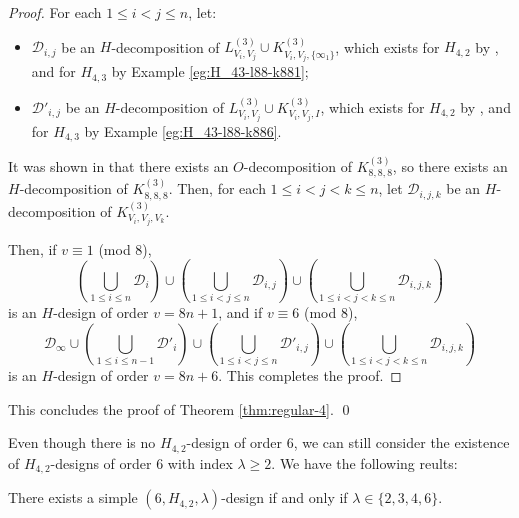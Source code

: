 \begin{proof}
For each $1 \leq i < j \leq n$, let:
\begin{itemize}
  \item $\mathcal{D}_{i,j}$ be an $H$-decomposition of $L_{V_i,V_j}^{(3)} \cup K_{V_i,V_j,\{\infty_1\}}^{(3)}$,
  which exists for $H_{4,2}$ by \cite{bryant}, and for $H_{4,3}$ by Example \ref{eg:H_43-l88-k881};
  \item $\mathcal{D}'_{i,j}$ be an $H$-decomposition of $L_{V_i,V_j}^{(3)} \cup K_{V_i,V_j,I}^{(3)}$,
  which exists for $H_{4,2}$ by \cite{bryant}, and for $H_{4,3}$ by Example \ref{eg:H_43-l88-k886}.
\end{itemize}

It was shown in \cite{hanani} that there exists an $O$-decomposition of $K_{8,8,8}^{(3)}$, so there exists an $H$-decomposition of $K_{8,8,8}^{(3)}$.
Then, for each $1 \leq i < j < k \leq n$, let $\mathcal{D}_{i,j,k}$ be an $H$-decomposition of $K_{V_i,V_j,V_k}^{(3)}$.

Then, if $v \equiv 1$ (mod 8),
\[
    \left( \bigcup_{1 \leq i \leq n} \mathcal{D}_i \right)
    \cup \left( \bigcup_{1 \leq i < j \leq n} \mathcal{D}_{i,j} \right)
    \cup \left( \bigcup_{1 \leq i < j < k \leq n} \mathcal{D}_{i,j,k} \right)
\]
is an $H$-design of order $v = 8n+1$, and if $v \equiv 6$ (mod 8),
\[
    \mathcal{D}_\infty \cup \left( \bigcup_{1 \leq i \leq n-1}
    \mathcal{D}'_i \right) \cup \left( \bigcup_{1 \leq i < j \leq n}
    \mathcal{D}'_{i,j} \right) \cup \left( \bigcup_{1
    \leq i < j < k \leq n} \mathcal{D}_{i,j,k} \right)
\]
is an $H$-design of order $v = 8n+6$. This completes the proof.

\end{proof}

This concludes the proof of Theorem \ref{thm:regular-4}. \qed

Even though there is no $H_{4,2}$-design of order $6$, we can still consider the existence of $H_{4,2}$-designs of order $6$ with index $\lambda \geq 2$.
We have the following reults:

\begin{theorem} \label{thm:H_42-6-simple}
There exists a simple $(6, H_{4,2}, \lambda)$-design if and only if $\lambda \in \{2, 3, 4, 6\}$.
\end{theorem}

